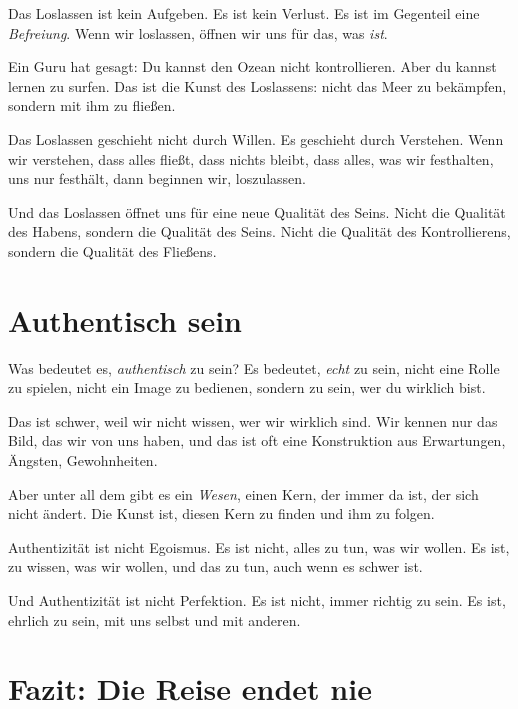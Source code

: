 Das Loslassen ist kein Aufgeben. Es ist kein Verlust. Es ist im Gegenteil eine \emph{Befreiung}. Wenn wir loslassen, öffnen wir uns für das, was \emph{ist}.

Ein Guru hat gesagt: \glqq Du kannst den Ozean nicht kontrollieren. Aber du kannst lernen zu surfen.\grqq{} Das ist die Kunst des Loslassens: nicht das Meer zu bekämpfen, sondern mit ihm zu fließen.

Das Loslassen geschieht nicht durch Willen. Es geschieht durch Verstehen. Wenn wir verstehen, dass alles fließt, dass nichts bleibt, dass alles, was wir festhalten, uns nur festhält, dann beginnen wir, loszulassen.

Und das Loslassen öffnet uns für eine neue Qualität des Seins. Nicht die Qualität des Habens, sondern die Qualität des Seins. Nicht die Qualität des Kontrollierens, sondern die Qualität des Fließens.

\section{Authentisch sein}

Was bedeutet es, \emph{authentisch} zu sein? Es bedeutet, \emph{echt} zu sein, nicht eine Rolle zu spielen, nicht ein Image zu bedienen, sondern zu sein, wer du wirklich bist.

Das ist schwer, weil wir nicht wissen, wer wir wirklich sind. Wir kennen nur das Bild, das wir von uns haben, und das ist oft eine Konstruktion aus Erwartungen, Ängsten, Gewohnheiten.

Aber unter all dem gibt es ein \emph{Wesen}, einen Kern, der immer da ist, der sich nicht ändert. Die Kunst ist, diesen Kern zu finden und ihm zu folgen.

Authentizität ist nicht Egoismus. Es ist nicht, alles zu tun, was wir wollen. Es ist, zu wissen, was wir wollen, und das zu tun, auch wenn es schwer ist.

Und Authentizität ist nicht Perfektion. Es ist nicht, immer \glqq richtig\grqq{} zu sein. Es ist, ehrlich zu sein, mit uns selbst und mit anderen.

\section{Fazit: Die Reise endet nie}

